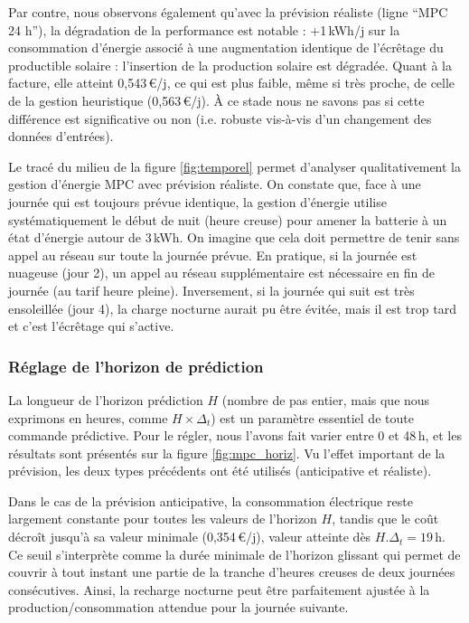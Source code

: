 \documentclass[a4paper,10pt,twocolumn]{article}
\begin{document}
Par contre, nous observons également qu'avec la prévision réaliste (ligne ``MPC 24 h''),
la dégradation de la performance est notable : +1\,kWh/j sur la consommation d'énergie
associé à une augmentation identique de l'écrêtage du productible solaire :
l'insertion de la production solaire est dégradée.
Quant à la facture, elle atteint 0,543\,€/j, ce qui est plus faible,
même si très proche, de celle de la gestion heuristique (0,563\,€/j).
À ce stade nous ne savons pas si cette différence est significative ou non
(i.e. robuste vis-à-vis d'un changement des données d'entrées).

Le tracé du milieu de la figure \ref{fig:temporel} permet d'analyser qualitativement
la gestion d'énergie MPC avec prévision réaliste.
On constate que, face à une journée qui est toujours prévue identique, 
la gestion d'énergie utilise systématiquement le début de nuit (heure creuse) pour amener la batterie
à un état d'énergie autour de 3\,kWh.
On imagine que cela doit permettre de tenir sans appel au réseau sur toute la journée prévue.
En pratique, si la journée est nuageuse (jour 2), un appel au réseau supplémentaire
est nécessaire en fin de journée (au tarif heure pleine).
Inversement, si la journée qui suit est très ensoleillée (jour 4),
la charge nocturne aurait pu être évitée, mais il est trop tard
et c'est l'écrêtage qui s'active.

\subsubsection{Réglage de l'horizon de prédiction}
La longueur de l'horizon prédiction $H$ (nombre de pas entier,
mais que nous exprimons en heures, comme $H \times \Delta_t$)
est un paramètre essentiel de toute commande prédictive.
Pour le régler, nous l'avons fait varier entre 0 et 48\,h,
et les résultats sont présentés sur la figure \ref{fig:mpc_horiz}.
Vu l'effet important de la prévision, les deux types précédents
ont été utilisés (anticipative et réaliste).

Dans le cas de la prévision anticipative, la consommation électrique
reste largement constante pour toutes les valeurs de l'horizon $H$,
tandis que le coût décroît jusqu'à sa valeur minimale (0,354\,€/j),
valeur atteinte dès $H.\Delta_t = 19$\,h.
Ce seuil s'interprète comme la durée minimale de l'horizon glissant qui permet de couvrir
à tout instant une partie de la tranche d'heures creuses de deux journées consécutives.
Ainsi, la recharge nocturne peut être parfaitement ajustée à la production/consommation
attendue pour la journée suivante.
\end{document}
